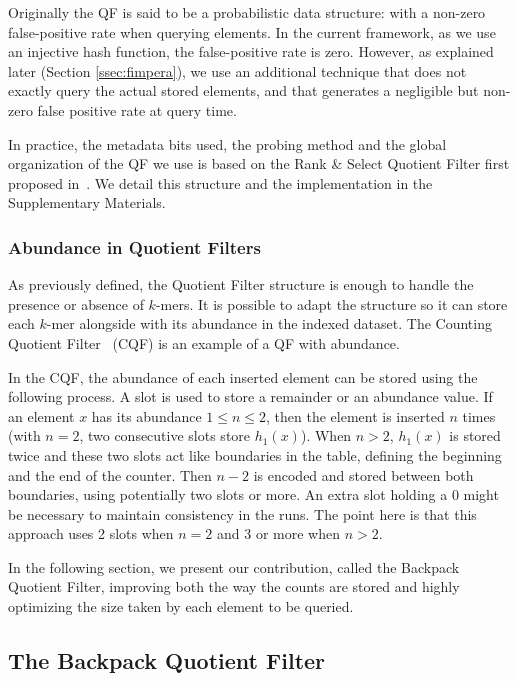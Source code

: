 Originally the QF is said to be a probabilistic data structure: with a non-zero false-positive rate when querying elements. In the current framework, as we use an injective hash function, the false-positive rate is zero. However, as explained later (Section \ref{ssec:fimpera}), we use an additional technique that does not exactly query the actual stored elements, and that generates a negligible but non-zero false positive rate at query time.

In practice, the metadata bits used, the probing method and the global organization of the QF we use is based on the Rank \& Select Quotient Filter first proposed in~\cite{counting_quotient_filter_2017}. We detail this structure and the implementation in the Supplementary Materials.


\subsubsection{Abundance in Quotient Filters} 

As previously defined, the Quotient Filter structure is enough to handle the presence or absence of $k$-mers. It is possible to adapt the structure so it can store each $k$-mer alongside with its abundance in the indexed dataset. The Counting Quotient Filter~\cite{counting_quotient_filter_2017} (CQF) is an example of a QF with abundance. 

In the CQF, the abundance of each inserted element can be stored using the following process. A slot is used to store a remainder or an abundance value. If an element $x$ has its abundance $1 \leq n \leq 2$, then the element is inserted $n$ times (with $n=2$, two consecutive slots store $h_1(x)$). When $n > 2$, $h_1(x)$ is stored twice and these two slots act like boundaries in the table, defining the beginning and the end of the counter. Then $n-2$ is encoded and stored between both boundaries, using potentially two slots or more. An extra slot holding a $0$ might be necessary to maintain consistency in the runs. The point here is that this approach uses 2 slots when $n = 2$ and 3 or more when $n > 2$.

In the following section, we present our contribution, called the Backpack Quotient Filter, improving both the way the counts are stored and highly optimizing the size taken by each element to be queried.

\subsection{The Backpack Quotient Filter}\label{ssec:mm:bqf}

